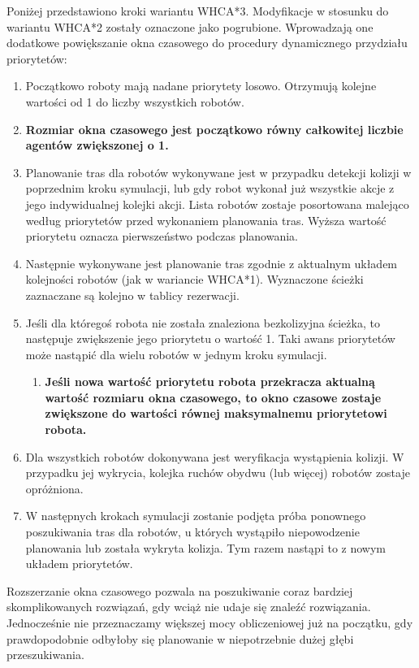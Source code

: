 Poniżej przedstawiono kroki wariantu WHCA*3. Modyfikacje w stosunku do wariantu WHCA*2 zostały oznaczone jako pogrubione. Wprowadzają one dodatkowe powiększanie okna czasowego do procedury dynamicznego przydziału priorytetów:
\begin{enumerate}
	\item Początkowo roboty mają nadane priorytety losowo. Otrzymują kolejne wartości od 1 do liczby wszystkich robotów.
	\item {\bf Rozmiar okna czasowego jest początkowo równy całkowitej liczbie agentów zwiększonej o 1.}
	\item Planowanie tras dla robotów wykonywane jest w przypadku detekcji kolizji w poprzednim kroku symulacji, lub gdy robot wykonał już wszystkie akcje z jego indywidualnej kolejki akcji.
	Lista robotów zostaje posortowana malejąco według priorytetów przed wykonaniem planowania tras. Wyższa wartość priorytetu oznacza pierwszeństwo podczas planowania.
	\item Następnie wykonywane jest planowanie tras zgodnie z aktualnym układem kolejności robotów (jak w wariancie WHCA*1). Wyznaczone ścieżki zaznaczane są kolejno w tablicy rezerwacji.
	\item Jeśli dla któregoś robota nie została znaleziona bezkolizyjna ścieżka, to następuje zwiększenie jego priorytetu o wartość 1. Taki awans priorytetów może nastąpić dla wielu robotów w jednym kroku symulacji.
	\begin{enumerate}
		\item {\bf Jeśli nowa wartość priorytetu robota przekracza aktualną wartość rozmiaru okna czasowego, to okno czasowe zostaje zwiększone do wartości równej maksymalnemu priorytetowi robota.}
	\end{enumerate}
	\item Dla wszystkich robotów dokonywana jest weryfikacja wystąpienia kolizji. W przypadku jej wykrycia, kolejka ruchów obydwu (lub więcej) robotów zostaje opróżniona.
	\item W następnych krokach symulacji zostanie podjęta próba ponownego poszukiwania tras dla robotów, u których wystąpiło niepowodzenie planowania lub została wykryta kolizja. Tym razem nastąpi to z nowym układem priorytetów.
\end{enumerate}

Rozszerzanie okna czasowego pozwala na poszukiwanie coraz bardziej skomplikowanych rozwiązań, gdy wciąż nie udaje się znaleźć rozwiązania. Jednocześnie nie przeznaczamy większej mocy obliczeniowej już na początku, gdy prawdopodobnie odbyłoby się planowanie w niepotrzebnie dużej głębi przeszukiwania.


